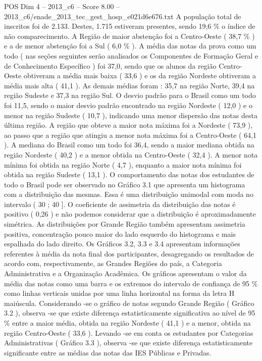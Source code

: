 \begin{textsample}{POS Dim 4 – 2013\_c6 – Score 8.00 – 2013\_c6/enade\_2013\_tec\_gest\_hosp\_e021d6e676.txt}
A população total de inscritos foi de 2.133.
Destes, 1.715 estiveram presentes, sendo 19,6 \% o índice de não comparecimento.
A Região de maior abstenção foi a Centro-Oeste ( 38,7 \% ) e a de menor abstenção foi a Sul ( 6,0 \% ).
A média das notas da prova como um todo ( nas seções seguintes serão analisados os Componentes de Formação Geral e de Conhecimento Específico ) foi 37,0, sendo que os alunos da região Centro-Oeste obtiveram a média mais baixa ( 33,6 ) e os da região Nordeste obtiveram a média mais alta ( 41,1 ).
As demais médias foram : 35,7 na região Norte, 39,4 na região Sudeste e 37,3 na região Sul.
O desvio padrão para o Brasil como um todo foi 11,5, sendo o maior desvio padrão encontrado na região Nordeste ( 12,0 ) e o menor na região Sudeste ( 10,7 ), indicando uma menor dispersão das notas desta última região.
A região que obteve a maior nota máxima foi a Nordeste ( 73,9 ), ao passo que a região que atingiu a menor nota máxima foi a Centro-Oeste ( 64,1 ).
A mediana do Brasil como um todo foi 36,4, sendo a maior mediana obtida na região Nordeste ( 40,2 ) e a menor obtida na Centro-Oeste ( 32,4 ).
A menor nota mínima foi obtida na região Norte ( 4,7 ), enquanto a maior nota mínima foi obtida na região Sudeste ( 13,1 ).
O comportamento das notas dos estudantes de todo o Brasil pode ser observado no Gráfico 3.1 que apresenta um histograma com a distribuição das mesmas.
Essa é uma distribuição unimodal com moda no intervalo ( 30 ; 40 ].
O coeficiente de assimetria da distribuição das notas é positivo ( 0,26 ) e não podemos considerar que a distribuição é aproximadamente simétrica.
As distribuições por Grande Região também apresentam assimetria positiva, concentração pouco maior do lado esquerdo do histograma e mais espalhada do lado direito.
Os Gráficos 3.2, 3.3 e 3.4 apresentam informações referentes à média da nota final dos participantes, desagregando os resultados de acordo com, respectivamente, as Grandes Regiões do país, a Categoria Administrativa e a Organização Acadêmica.
Os gráficos apresentam o valor da média das notas como uma barra e os extremos do intervalo de confiança de 95 \% como linhas verticais unidas por uma linha horizontal na forma da letra H maiúscula.
Considerando -se o gráfico de notas segundo Grande Região ( Gráfico 3.2 ), observa -se que existe diferença estatisticamente significativa ao nível de 95 \% entre a maior média, obtida na região Nordeste ( 41,1 ) e a menor, obtida na região Centro-Oeste ( 33,6 ).
Levando -se em conta os estudantes por Categorias Administrativas ( Gráfico 3.3 ), observa -se que existe diferença estatisticamente significante entre as médias das notas das IES Públicas e Privadas.

\end{textsample}
